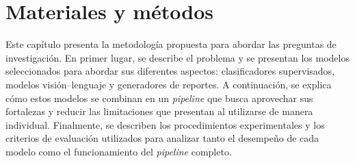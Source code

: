 \chapter[Materiales y métodos]{Materiales y métodos}
\label{cp:metodos}
%
%


Este capítulo presenta la metodología propuesta para abordar las preguntas de investigación. En primer lugar, se
describe el problema y se presentan los modelos seleccionados para abordar sus diferentes aspectos: clasificadores
supervisados, modelos visión--lenguaje y generadores de reportes. A continuación, se explica cómo estos modelos se
combinan en un \emph{pipeline} que busca aprovechar sus fortalezas y reducir las limitaciones que presentan al
utilizarse de manera individual. Finalmente, se describen los procedimientos experimentales y los criterios de
evaluación utilizados para analizar tanto el desempeño de cada modelo como el funcionamiento del \emph{pipeline}
completo.

